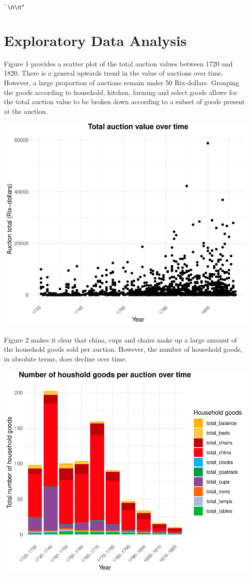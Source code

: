 \documentclass[11pt,preprint, authoryear]{elsarticle}
\numberwithin{equation}{section}
\numberwithin{figure}{section}
\numberwithin{table}{section}
\begin{document}
\begin{verbatim}
`\n\n"
\end{verbatim}

\hypertarget{exploratory-data-analysis}{%
\section{Exploratory Data Analysis}\label{exploratory-data-analysis}}

Figure 1 provides a scatter plot of the total auction values between
1720 and 1820. There is a general upwards trend in the value of auctions
over time. However, a large proportion of auctions remain under 50
Rix-dollars. Grouping the goods according to household, kitchen, farming
and select goods allows for the total auction value to be broken down
according to a subset of goods present at the auction.

\includegraphics{Project_write_up_files/figure-latex/Figure1-1.pdf}

Figure 2 makes it clear that china, cups and chairs make up a large
amount of the household goods sold per auction. However, the number of
household goods, in absolute terms, does decline over time.

\includegraphics{Project_write_up_files/figure-latex/Figure2-1.pdf}
\end{document}
